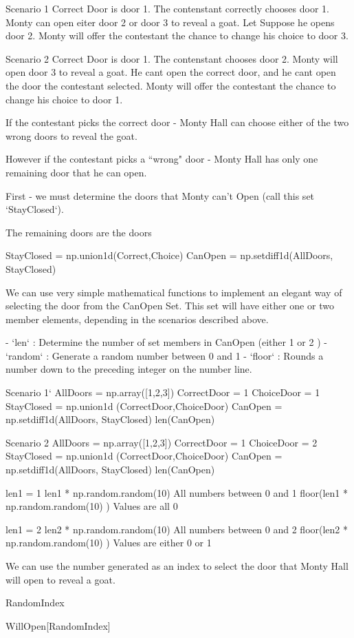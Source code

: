 

Scenario 1
Correct Door is door 1.
The contenstant correctly chooses door 1.
Monty can open eiter door 2 or door 3 to reveal a goat.
Let Suppose he opens door 2.
Monty will offer the contestant the chance to change his choice to door 3.


Scenario 2
Correct Door is door 1.
The contenstant chooses door 2.
Monty will open door 3 to reveal a goat. He cant open the correct door, and he cant open the door the contestant selected.
Monty will offer the contestant the chance to change his choice to door 1.



If the contestant picks the correct door - Monty Hall can choose either of the two wrong doors to reveal the goat.


However if the contestant picks a ``wrong" door -  Monty Hall has only one remaining door that he can open.


First - we must determine the doors that Monty can't Open (call this set `StayClosed`).

The remaining doors are the doors 

StayClosed = np.union1d(Correct,Choice)
CanOpen  = np.setdiff1d(AllDoors, StayClosed)


We can use very simple mathematical functions to implement an elegant way of selecting the door from the CanOpen Set. 
This set will have either one or two member elements, depending in the scenarios described above.

 - `len` : Determine the number of set members in CanOpen (either 1 or 2 )
 - `random` : Generate a random number between 0 and 1
 - `floor` : Rounds a number down to the preceding integer on the number line.


Scenario 1`
AllDoors = np.array([1,2,3])
CorrectDoor = 1
ChoiceDoor = 1
StayClosed = np.union1d (CorrectDoor,ChoiceDoor)
CanOpen = np.setdiff1d(AllDoors, StayClosed)
len(CanOpen)

Scenario 2
AllDoors = np.array([1,2,3])
CorrectDoor = 1
ChoiceDoor = 2
StayClosed = np.union1d (CorrectDoor,ChoiceDoor)
CanOpen = np.setdiff1d(AllDoors, StayClosed)
len(CanOpen)

len1 = 1
len1 * np.random.random(10)
All numbers between 0 and 1
floor(len1 * np.random.random(10) )
Values are all 0 

len1 = 2
len2 * np.random.random(10)
All numbers between 0 and 2
floor(len2 * np.random.random(10) )
Values are either 0 or 1

We can use the number generated as an index to select the door that Monty Hall will open to reveal a goat.

RandomIndex

WillOpen[RandomIndex]

